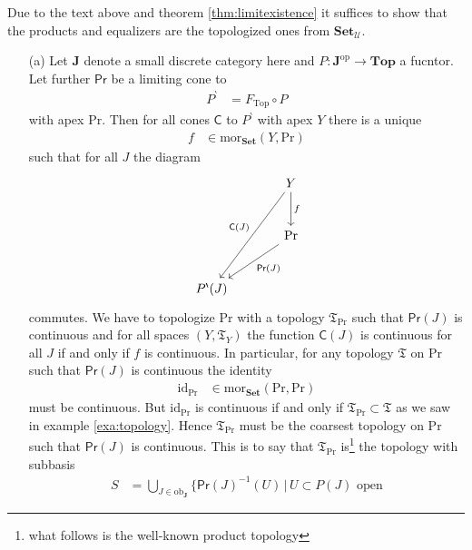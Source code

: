 \begin{prf}
Due to the text above and theorem \ref{thm:limitexistence} it suffices to show that the products and equalizers are the topologized ones from $\mathbf{Set}_{\mathcal{U}}$.
\begin{enumerate}
\item[(a)]
Let $\mathbf{J}$ denote a small discrete category here and $P \colon \mathbf{J}^{\mathrm{op}} \rightarrow \mathbf{Top}$ a fucntor. Let further $\mathsf{Pr}$ be a limiting cone to
\begin{align*}
  P^{\backprime}
  &=
  F_{\mathrm{Top}}
  \circ
  P
\end{align*}
with apex $\mathrm{Pr}$. Then for all cones $\mathsf{C}$ to $P^{\backprime}$ with apex $Y$ there is a unique
\begin{align*}
  f
  &\in
  \mathrm{mor}_{\mathbf{Set}}
  \left(
    Y,
    \mathrm{Pr}
  \right)
\end{align*}
such that for all $J$ the diagram
\[
\begin{tikzcd}[sep=large]
  &
  Y
  \arrow{d}{f}
  \arrow[swap]{ddl}{\mathsf{C}(J)}
  \\
  &
  \mathrm{Pr}
  \arrow{dl}{\mathsf{Pr}(J)}
  \\
  P^{\backprime}(J)
\end{tikzcd}
\]
commutes. We have to topologize $\mathrm{Pr}$ with a topology $\mathfrak{T}_{\mathrm{Pr}}$ such that $\mathsf{Pr}(J)$ is continuous and for all spaces $(Y,\mathfrak{T}_{Y})$ the function $\mathsf{C}(J)$ is continuous for all $J$ if and only if $f$ is continuous. In particular, for any topology $\mathfrak{T}$ on $\mathrm{Pr}$ such that $\mathsf{Pr}(J)$ is continuous the identity
\begin{align*}
  \mathrm{id}_{\mathrm{Pr}}
  &\in
  \mathrm{mor}_{\mathbf{Set}}
  \left(
    \mathrm{Pr},
    \mathrm{Pr}
  \right)
\end{align*}
must be continuous. But $\mathrm{id}_{\mathrm{Pr}}$ is continuous if and only if $\mathfrak{T}_{\mathrm{Pr}} \subset \mathfrak{T}$ as we saw in example \ref{exa:topology}. Hence $\mathfrak{T}_{\mathrm{Pr}}$ must be the coarsest topology on $\mathrm{Pr}$ such that $\mathsf{Pr}(J)$ is continuous. This is to say that $\mathfrak{T}_{\mathrm{Pr}}$ is\footnote{what follows is the well-known product topology} the topology with subbasis
\begin{align*}
  S
  &=
  \bigcup_{J \in \mathrm{ob}_{\mathbf{J}}}
  \lbrace
      \mathsf{Pr}(J)^{-1}(U)
    \,
    \vert
    \,
      U
      \subset
      P(J)
      \text{ open}

\end{align*}
\end{enumerate}
\end{prf}
